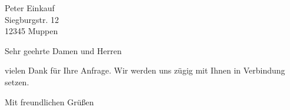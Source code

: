 \documentclass[ppsbill]{scrlttr2}
\begin{document}


\begin{letter}{%
	Peter Einkauf\\
	Siegburgstr. 12\\
	12345 Muppen\\
}
\opening{Sehr geehrte Damen und Herren}

vielen Dank für Ihre Anfrage. Wir werden uns zügig mit Ihnen in Verbindung setzen.


\closing{Mit freundlichen Grüßen}
\end{letter}
\end{document}
